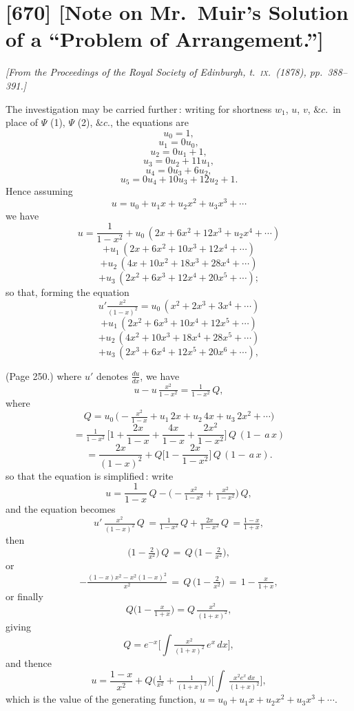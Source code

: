 \documentclass[11pt,a4paper]{article}
\theoremstyle{plain}
\theoremstyle{definition}
\begin{document}
\bigskip

\section{[670] [Note on Mr.\ Muir's Solution of a ``Problem of Arrangement.'']}
\label{sec:670}

\noindent\textit{[From the \emph{Proceedings of the Royal Society of Edinburgh}, t.~\textsc{ix.}\ (1878), pp.~388--391.]}

\medskip

\noindent The investigation may be carried further\,: writing for shortness $w_1$, $u$, $v$, $\&c$.\ in place of $\Psi$ (1), $\Psi$ (2), $\&c$., the equations are
\[
u_0 = 1,
\]
\[
u_1 = 0u_0,
\]
\[
u_2 = 0u_1 + 1,
\]
\[
u_3 = 0u_2 + 11u_1,
\]
\[
u_4 = 0u_3 + 6u_2,
\]
\[
u_5 = 0u_4 + 10u_3 + 12u_2 + 1.
\]
Hence assuming
\[
u = u_0 + u_1 x + u_2 x^2 + u_3 x^3 + \cdots
\]
we have
\[
u = \frac{1}{1 - x^2} + u_0\,(2x + 6x^2 + 12x^3 + u_2 x^4 + \cdots)
\]
\[
+ u_1\,(2 x + 6 x^2 + 10 x^3 + 12 x^4 + \cdots)
\]
\[
+ u_2\,(4 x + 10 x^2 + 18 x^3 + 28 x^4 + \cdots)
\]
\[
+ u_3\,(2 x^2 + 6 x^3 + 12 x^4 + 20 x^5 + \cdots);
\]
so that, forming the equation
\[
u' \tfrac{x^2}{(1 - x)^2} = u_0\,(x^2 + 2 x^3 + 3 x^4 + \cdots)
\]
\[
+ u_1\,(2 x^2 + 6 x^3 + 10 x^4 + 12 x^5 + \cdots)
\]
\[
+ u_2\,(4 x^2 + 10 x^3 + 18 x^4 + 28 x^5 + \cdots)
\]
\[
+ u_3\,(2 x^3 + 6 x^4 + 12 x^5 + 20 x^6 + \cdots),
\]

\medskip

\noindent (Page 250.) where $u'$ denotes $\frac{du}{dx}$, we have
\[
u - u\,\tfrac{x^2}{1 - x^2} = \tfrac{1}{1 - x^2}\,Q,
\]
where
\[
Q = u_0\,\Big(- \tfrac{x^2}{1 - x} + u_1\,2x + u_2\,4x + u_3\,2x^2 + \cdots\Big)
\]
\[
= \tfrac{1}{1 - x^2}\,\Big[1 + \frac{2x}{1 - x} + \frac{4x}{1 - x} + \frac{2x^2}{1 - x^2}\Big]\,Q\,(1 - \,a\,x)
\]
\[
= \frac{2 x}{(1 - x)^2} + Q\Big[1 - \frac{2x}{1 - x^2}\Big]\,Q\,(1 - \,a\,x).
\]
so that the equation is simplified\,: write
\[
u = \frac{1}{1 - x}\,Q - \Big( - \tfrac{x^2}{1 - x^2} + \tfrac{x^2}{1 - x^2}\Big)\,Q,
\]
and the equation becomes
\[
u'\,\tfrac{x^2}{(1 - x)^2}\,Q\,= \tfrac{1}{1 - x^2}\,Q + \tfrac{2x}{1 - x^2}\,Q\,= \tfrac{1 - x}{1 + x},
\]
then
\[
\Big(1 - \tfrac{2}{x^2}\Big)\,Q\,= \,Q\,\big(1 - \tfrac{2}{x^2}\big),
\]
or
\[
- \tfrac{(1 - x)x^2 - x^2(1 - x)^2}{x^2}\,= \,Q\,\Big(1 - \tfrac{2}{x^2}\Big)\,= \,1 - \tfrac{x}{1 + x},
\]
or finally
\[
Q\big(1 - \tfrac{x}{1 + x}\big) = Q\,\tfrac{x^2}{(1 + x)^2},
\]
giving
\[
Q = e^{-x}\Big[\int \tfrac{x^2}{(1 + x)^2}\,e^x\,dx\Big],
\]
and thence
\[
u = \frac{1 - x}{x^2} + Q\big(\tfrac{1}{x^2} + \tfrac{1}{(1 + x)^2}\big)\Big[\int\,\tfrac{x^2 e^x\,dx}{(1 + x)^2}\Big],
\]
which is the value of the generating function, $u = u_0 + u_1 x + u_2 x^2 + u_3 x^3 + \cdots$.
\end{document}
